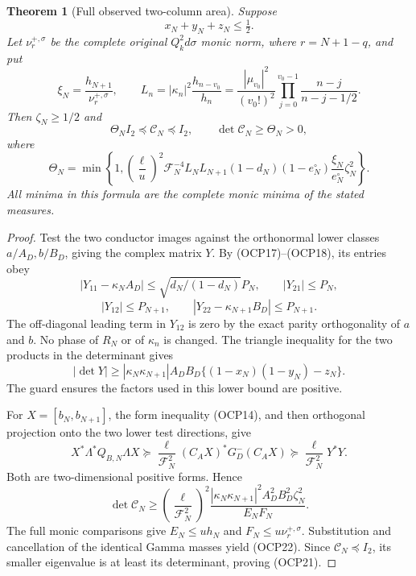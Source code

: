 \documentclass[11pt]{article}
\newtheorem{theorem}{Theorem}[section]
\begin{document}
\begin{theorem}[Full observed two-column area]
Suppose
\[
 x_N+y_N+z_N\le\tfrac12.
 \tag{OCP19}
\]
Let $\nu_r^{+,\sigma}$ be the complete original $Q_k^2d\sigma$ monic norm, where $r=N+1-q$, and put
\[
 \xi_N=\frac{h_{N+1}}{\nu_r^{+,\sigma}},\qquad
 L_n=|\kappa_n|^2\frac{h_{n-v_0}}{h_n}
 =\frac{|\mu_{v_0}|^2}{(v_0!)^2}
 \prod_{j=0}^{v_0-1}\frac{n-j}{n-j-1/2}.
 \tag{OCP20}
\]
Then $\zeta_N\ge1/2$ and
\[
 \boxed{\Theta_N I_2\preceq\mathcal C_N\preceq I_2,\qquad
 \det\mathcal C_N\ge\Theta_N>0,}
 \tag{OCP21}
\]
where
\[
 \boxed{\Theta_N=\min\left\{1,
 \left(\frac\ell u\right)^2\mathcal F_N^{-4}
 L_NL_{N+1}(1-d_N)(1-e_N^{\circ})
 \frac{\xi_N}{e_N^{\circ}}\zeta_N^2\right\}.}
 \tag{OCP22}
\]
All minima in this formula are the complete monic minima of the stated measures.
\end{theorem}
\begin{proof}
Test the two conductor images against the orthonormal lower classes $a/A_D,b/B_D$, giving the complex matrix $Y$. By (OCP17)--(OCP18), its entries obey
\[
 |Y_{11}-\kappa_NA_D|\le\sqrt{d_N/(1-d_N)}P_N,
 \qquad |Y_{21}|\le P_N,
\]
\[
 |Y_{12}|\le P_{N+1},\qquad
 |Y_{22}-\kappa_{N+1}B_D|\le P_{N+1}.
\]
The off-diagonal leading term in $Y_{12}$ is zero by the exact parity orthogonality of $a$ and $b$. No phase of $R_N$ or of $\kappa_n$ is changed. The triangle inequality for the two products in the determinant gives
\[
 |\det Y|\ge
 |\kappa_N\kappa_{N+1}|A_DB_D
 \{(1-x_N)(1-y_N)-z_N\}.
 \tag{OCP23}
\]
The guard ensures the factors used in this lower bound are positive.

For $X=[b_N,b_{N+1}]$, the form inequality (OCP14), and then orthogonal projection onto the two lower test directions, give
\[
 X^*\Lambda^*Q_{B,N}\Lambda X
 \succeq\frac\ell{\mathcal F_N^2}(C_AX)^*G^-_D(C_AX)
 \succeq\frac\ell{\mathcal F_N^2}Y^*Y.
\]
Both are two-dimensional positive forms. Hence
\[
 \det\mathcal C_N\ge
 \left(\frac\ell{\mathcal F_N^2}\right)^2
 \frac{|\kappa_N\kappa_{N+1}|^2A_D^2B_D^2\zeta_N^2}{E_NF_N}.
\]
The full monic comparisons give $E_N\le u h_N$ and $F_N\le u\nu_r^{+,\sigma}$. Substitution and cancellation of the identical Gamma masses yield (OCP22). Since $\mathcal C_N\preceq I_2$, its smaller eigenvalue is at least its determinant, proving (OCP21).
\end{proof}
\end{document}
